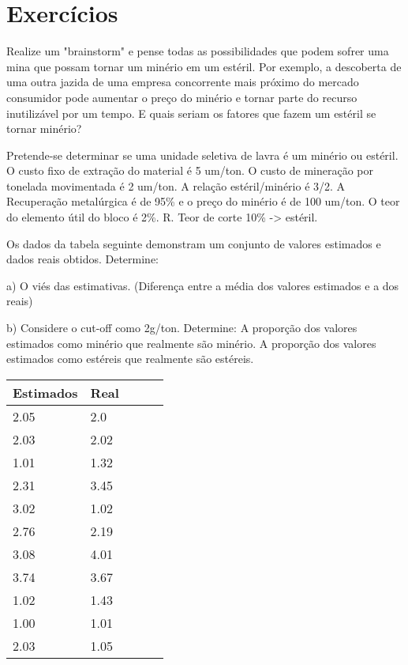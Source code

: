 \section{Exercícios}
\begin{exercise}
	Realize um "brainstorm" e pense todas as possibilidades que podem sofrer uma mina que possam tornar um minério em um estéril. Por exemplo, a descoberta de uma outra jazida de uma empresa concorrente mais próximo do mercado consumidor pode aumentar o preço do minério e tornar parte do recurso inutilizável por um tempo. E quais seriam os fatores que fazem um estéril se tornar minério? 
\end{exercise}
\begin{exercise}
	Pretende-se determinar se uma unidade seletiva de lavra é um minério ou estéril. O custo fixo de extração do material é 5 um/ton. O custo de mineração por tonelada movimentada é 2 um/ton. A relação estéril/minério é 3/2. A Recuperação metalúrgica é de 95\% e o preço do minério é de 100 um/ton. O teor do elemento útil do bloco é 2\%. R. Teor de corte 10\% -> estéril.  
\end{exercise}

\begin{exercise}

Os dados da tabela seguinte demonstram um conjunto de valores estimados e dados reais obtidos. Determine:

a) O viés das estimativas. (Diferença entre a média dos valores estimados e a dos reais)

b) Considere o cut-off como 2g/ton. Determine: A proporção dos valores estimados como minério que realmente são minério. A proporção dos valores estimados como estéreis que realmente são estéreis. 

	\begin{tabular}{lllll}
		\hline
		Estimados & Real &  &  &  \\ \hline
		2.05      & 2.0  &  &  &  \\
		2.03      & 2.02 &  &  &  \\
		1.01      & 1.32 &  &  &  \\
		2.31      & 3.45 &  &  &  \\
		3.02      & 1.02 &  &  &  \\
		2.76      & 2.19 &  &  &  \\
		3.08      & 4.01 &  &  &  \\
		3.74      & 3.67 &  &  &  \\
		1.02      & 1.43 &  &  &  \\
		1.00      & 1.01 &  &  &  \\
		2.03      & 1.05 &  &  &  \\ \hline
	\end{tabular}
\end{exercise}


